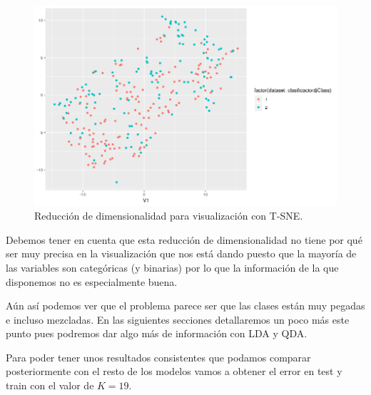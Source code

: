 \documentclass[12pt,a4paper]{article}
\begin{document}
\begin{figure}[H]
	\centering
	\includegraphics[scale=0.7]{./Imagenes/Clasificacion/tsne.png}
	\caption{Reducción de dimensionalidad para visualización con T-SNE.}
\end{figure}

Debemos tener en cuenta que esta reducción de dimensionalidad no tiene por qué ser muy precisa en la visualización que nos está dando puesto que la mayoría de las variables son categóricas (y binarias) por lo que la información de la que disponemos no es especialmente buena.

Aún así podemos ver que el problema parece ser que las clases están muy pegadas e incluso mezcladas. En las siguientes secciones detallaremos un poco más este punto pues podremos dar algo más de información con LDA y QDA.

Para poder tener unos resultados consistentes que podamos comparar posteriormente con el resto de los modelos vamos a obtener el error en test y train con el valor de $K=19$.
\end{document}
